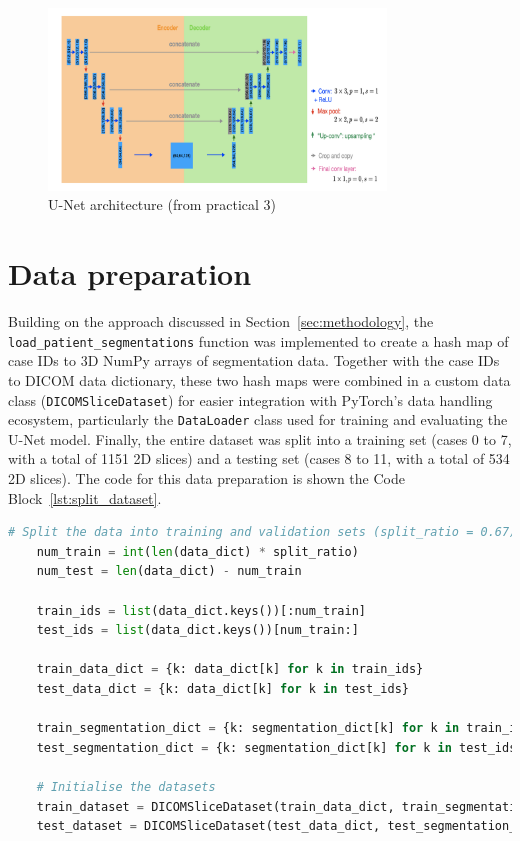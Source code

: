 \documentclass[12pt]{report}
\newcommand{\inlinecode}[1]{\lstinline[style=inline]{#1}}
\begin{document}
\begin{figure}[ht]
    \centering
    \includegraphics[width=0.8\textwidth]{unet_architecture.png}
    \caption{U-Net architecture (from practical 3)}
    \label{fig:arch}
\end{figure}
\vspace{-2em}
\section{Data preparation}

Building on the approach discussed in Section~\ref{sec:methodology}, the \inlinecode{load_patient_segmentations} function was implemented to create a hash map of case IDs to 3D NumPy arrays of segmentation data. Together with the case IDs to DICOM data dictionary, these two hash maps were combined in a custom data class (\inlinecode{DICOMSliceDataset}) for easier integration with PyTorch's data handling ecosystem, particularly the \inlinecode{DataLoader} class used for training and evaluating the U-Net model. Finally, the entire dataset was split into a training set (cases 0 to 7, with a total of 1151 2D slices) and a testing set (cases 8 to 11, with a total of 534 2D slices). The code for this data preparation is shown the Code Block~\ref{lst:split_dataset}.

\begin{lstlisting}[language=Python, caption=Splitting dataset into training and testing datasets, label=lst:split_dataset]
    # Split the data into training and validation sets (split_ratio = 0.67)
    num_train = int(len(data_dict) * split_ratio)
    num_test = len(data_dict) - num_train

    train_ids = list(data_dict.keys())[:num_train]
    test_ids = list(data_dict.keys())[num_train:]

    train_data_dict = {k: data_dict[k] for k in train_ids}
    test_data_dict = {k: data_dict[k] for k in test_ids}

    train_segmentation_dict = {k: segmentation_dict[k] for k in train_ids}
    test_segmentation_dict = {k: segmentation_dict[k] for k in test_ids}

    # Initialise the datasets
    train_dataset = DICOMSliceDataset(train_data_dict, train_segmentation_dict)
    test_dataset = DICOMSliceDataset(test_data_dict, test_segmentation_dict)
\end{lstlisting}
\end{document}
